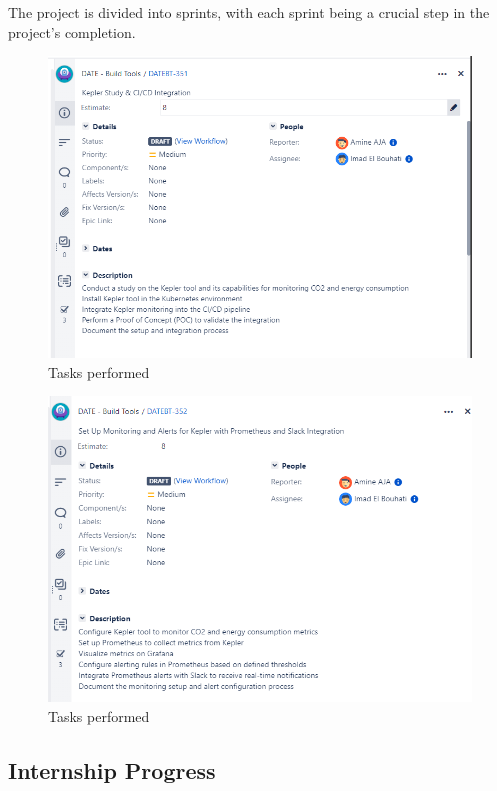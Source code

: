 The project is divided into sprints, with each sprint being a crucial step in the project's completion.

\begin{figure}[H]
    \centering
    \includegraphics[width=16cm]{Figures/us-1.png}
    \caption{Tasks performed}
\end{figure}

\begin{figure}[H]
  \centering
  \includegraphics[width=16cm]{Figures/us-2.png}
  \caption{Tasks performed}
\end{figure}

\subsection{Internship Progress}

